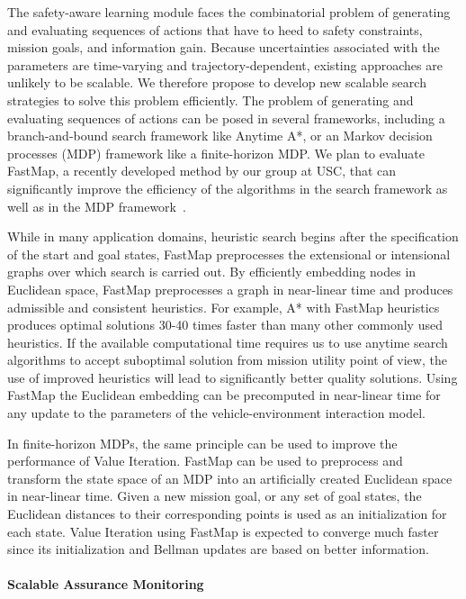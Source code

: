 The safety-aware learning module faces the combinatorial problem of generating and evaluating sequences of actions that have to heed to safety constraints, mission goals, and information gain. Because uncertainties associated with the parameters are time-varying and trajectory-dependent, existing approaches are unlikely to be scalable. We therefore propose to develop new scalable search strategies to solve this problem efficiently. The problem of generating and evaluating sequences of actions can be posed in several frameworks, including a branch-and-bound search framework like Anytime A*, or an Markov decision processes (MDP) framework like a finite-horizon MDP. We plan to evaluate FastMap, a recently developed method by our group at USC, that can significantly improve the efficiency of the algorithms in the search framework as well as in the MDP framework~\cite{cujakk}.

While in many application domains, heuristic search begins after the specification of the start and goal states, FastMap preprocesses the extensional or intensional graphs over which search is carried out.  By efficiently embedding nodes in Euclidean space, FastMap preprocesses a graph in near-linear time and produces admissible and consistent heuristics. For example, A* with FastMap heuristics produces optimal solutions 30-40 times faster than many other commonly used heuristics. If the available computational time requires us to use anytime search algorithms to accept suboptimal solution from mission utility point of view, the use of improved heuristics will lead to significantly better quality solutions. Using FastMap the Euclidean embedding can be precomputed in near-linear time for any update to the parameters of the vehicle-environment interaction model.

In finite-horizon MDPs, the same principle can be used to improve the performance of Value Iteration. FastMap can be used to preprocess and transform  the state space of an MDP  into an artificially created Euclidean space in near-linear time. Given a new mission goal, or any set of goal states, the Euclidean distances to their corresponding points is used as an initialization for each state. Value Iteration using FastMap is expected to converge much faster since its initialization and Bellman updates are based on better information.   

\paragraph{Scalable Assurance Monitoring}

